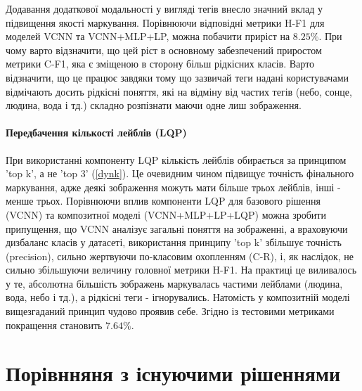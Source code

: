 \documentclass{udstu}
\begin{document}
Додавання додаткової модальності у вигляді тегів внесло значний вклад
у підвищення якості маркування.
Порівнюючи відповідні метрики H-F1 для моделей VCNN та VCNN+MLP+LP, можна
побачити приріст на $8.25\%$. При чому варто відзначити, що цей ріст в основному
забезпечений приростом метрики C-F1, яка є зміщеною в сторону більш рідкісних класів.
Варто відзначити, що це працює завдяки тому що зазвичай теги надані користувачами відмічають
досить рідкісні поняття, які на відміну від частих тегів (небо, сонце, людина, вода і тд.) складно
розпізнати маючи одне лиш зображення.

\paragraph{\textbf{Передбачення кількості лейблів (LQP)}\\}

При використанні компоненту LQP кількість лейблів обирається за принципом 'top k', а не 'top 3' (\ref{dynk}).
Це очевидним чином підвищує точність фінального  маркування, адже деякі зображення можуть мати більше трьох лейблів,
інші - менше трьох. Порівнюючи вплив компоненти LQP для базового рішення (VCNN) та композитної моделі (VCNN+MLP+LP+LQP)
можна зробити припущення, що VCNN аналізує загальні поняття на зображенні, а враховуючи дизбаланс класів у датасеті,
використання принципу 'top k' збільшує точність (precision), сильно жертвуючи по-класовим охопленням (C-R), і,
як наслідок, не сильно збільшуючи величину головної метрики H-F1. На практиці це виливалось у те, абсолютна більшість
зображень маркувалась частими лейблами (людина, вода, небо і тд.), а рідкісні теги - ігнорувались.
Натомість у композитній моделі вищезгаданий принцип чудово проявив себе.
Згідно із тестовими метриками покращення становить $7.64\%$.


\section{Порівнняня з існуючими рішеннями}
\end{document}
